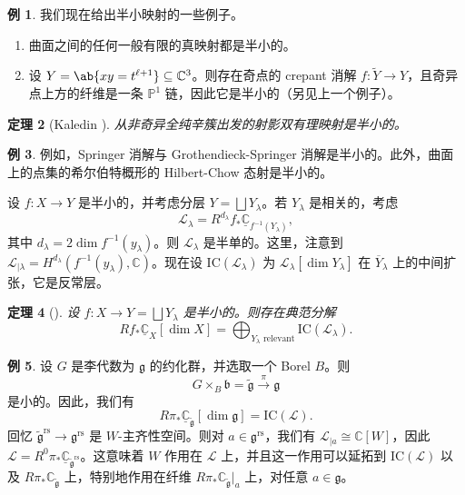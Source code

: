 \documentclass{amsart}
\newtheorem{thm}{定理}[section]
\theoremstyle{definition}
\newtheorem{exm}[thm]{例}
\newtheorem{exms}[thm]{例}
\theoremstyle{remark}
\theoremstyle{plain}
\theoremstyle{definition}
\theoremstyle{remark}
\newcommand{\C}{\mathbb{C}}
\renewcommand{\P}{\mathbb{P}}
\newcommand{\g}{\mathfrak{g}}
\renewcommand{\b}{\mathfrak{b}}
\newcommand{\mc}[1]{\mathcal{#1}}
\newcommand{\mr}[1]{\mathrm{#1}}
\newcommand{\on}[1]{\operatorname{#1}}
\newcommand{\ol}[1]{\overline{#1}}
\newcommand{\ul}[1]{\underline{#1}}
\newcommand{\1}{\mathbf{1}}
\newcommand{\2}{\mathbf{2}}
\newcommand{\3}{\mathbf{3}}
\begin{document}
\begin{exms}
    我们现在给出半小映射的一些例子。
    \begin{enumerate}
        \item 曲面之间的任何一般有限的真映射都是半小的。
        \item 设 \(Y = \ab\{xy = t^{\ell+1}\} \subseteq \C^3\)。则存在奇点的 crepant 消解 \(f \colon \tilde{Y} \to Y\)，且奇异点上方的纤维是一条 \(\P^1\) 链，因此它是半小的（另见上一个例子）。
    \end{enumerate}
\end{exms}

\begin{thm}[Kaledin {\cite{Kaledin2006}}]
    从非奇异全纯辛簇出发的射影双有理映射是半小的。
\end{thm}

\begin{exm}
    例如，Springer 消解与 Grothendieck-Springer 消解是半小的。此外，曲面上的点集的希尔伯特概形的 Hilbert-Chow 态射是半小的。
\end{exm}

设 \(f \colon X \to Y\) 是半小的，并考虑分层 \(Y = \bigsqcup Y_{\lambda}\)。若 \(Y_{\lambda}\) 是相关的，考虑
\[ \mc{L}_{\lambda} = R^{d_{\lambda}} f_* \ul{\C}_{f^{-1}(Y_{\lambda})}, \]
其中 \(d_{\lambda} = 2 \dim f^{-1} (y_{\lambda})\)。则 \(\mc{L}_{\lambda}\) 是半单的。这里，注意到 \(\mc{L}_{|\lambda} = H^{d_{\lambda}}(f^{-1}(y_{\lambda}), \C)\)。现在设 \(\mr{IC}(\mc{L}_{\lambda})\) 为 \(\mc{L}_{\lambda}[\dim Y_{\lambda}]\) 在 \(\ol{Y}_{\lambda}\) 上的中间扩张，它是反常层。

\begin{thm}[{\cite{DeCataldoMigliorini2002}}]
    设 \(f \colon X \to Y = \bigsqcup Y_{\lambda}\) 是半小的。则存在典范分解
    \[ R f_* \ul{\C}_X[\dim X] = \bigoplus_{Y_{\lambda}\text{ relevant}} \mr{IC}(\mc{L}_{\lambda}). \]
\end{thm}

\begin{exm}
    设 \(G\) 是李代数为 \(\g\) 的约化群，并选取一个 Borel \(B\)。则
    \[ G \times_B \b = \tilde{\g} \xrightarrow{\pi} \g \]
    是小的。因此，我们有
    \[ R \pi_* \ul{\C}_{\tilde{\g}} [\dim \g] = \mr{IC}(\mc{L}). \]
    回忆 \(\tilde{\g}^{\on{rs}} \to \g^{\on{rs}}\) 是 \(W\)-主齐性空间。则对 \(a \in \g^{\on{rs}}\)，我们有 \(\mc{L}_{|a} \cong \C[W]\)，因此 \(\mc{L} = R^0 \pi_* \ul{\C}_{\tilde{\g}^{\on{rs}}}\)。这意味着 \(W\) 作用在 \(\mc{L}\) 上，并且这一作用可以延拓到 \(\mr{IC}(\mc{L})\) 以及 \(R \pi_* \C_{\tilde{\g}}\) 上，特别地作用在纤维 \(R \pi_* \C_{\tilde{\g}}|_a\) 上，对任意 \(a \in \g\)。
\end{exm}
\end{document}
